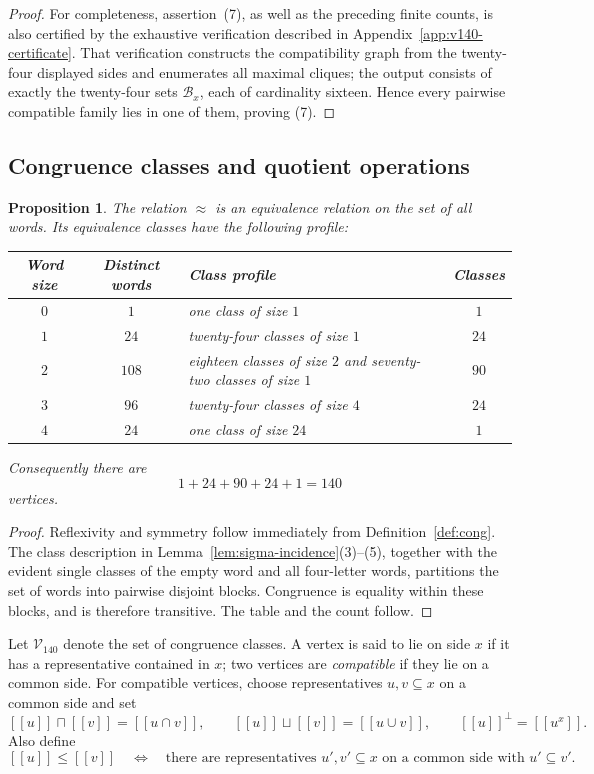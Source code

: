 \documentclass{article}   	%
\theoremstyle{plain}
\newtheorem{proposition}[theorem]{Proposition}
\theoremstyle{definition}
\theoremstyle{remark}
\begin{document}
\begin{proof}
For completeness, assertion~(7), as well as the preceding finite counts, is
also certified by the exhaustive verification described in
Appendix~\ref{app:v140-certificate}.  That verification constructs the
compatibility graph from the twenty-four displayed sides and enumerates all
maximal cliques; the output consists of exactly the twenty-four sets
$\mathcal B_x$, each of cardinality sixteen.  Hence every pairwise compatible
family lies in one of them, proving (7).
\end{proof}

\subsection{Congruence classes and quotient operations}

\begin{proposition}
\label{prop:cong-equivalence}
The relation $\approx$ is an equivalence relation on the set of all words.
Its equivalence classes have the following profile:
\begin{center}
\small
\begin{tabular}{c|c|p{5.0cm}|c}
\textbf{Word size} & \textbf{Distinct words} & \textbf{Class profile} &
\textbf{Classes}\\ \hline
$0$ & $1$ & one class of size $1$ & $1$\\
$1$ & $24$ & twenty-four classes of size $1$ & $24$\\
$2$ & $108$ & eighteen classes of size $2$ and seventy-two classes of size $1$ & $90$\\
$3$ & $96$ & twenty-four classes of size $4$ & $24$\\
$4$ & $24$ & one class of size $24$ & $1$
\end{tabular}
\end{center}
Consequently there are
\[
1+24+90+24+1=140
\]
vertices.
\end{proposition}

\begin{proof}
Reflexivity and symmetry follow immediately from Definition~\ref{def:cong}.
The class description in Lemma~\ref{lem:sigma-incidence}(3)--(5), together with
the evident single classes of the empty word and all four-letter words, partitions
the set of words into pairwise disjoint blocks.  Congruence is equality within
these blocks, and is therefore transitive.  The table and the count follow.
\end{proof}

Let $\mathcal V_{140}$ denote the set of congruence classes.  A vertex is said
to lie on side $x$ if it has a representative contained in $x$; two vertices
are \emph{compatible} if they lie on a common side.  For compatible vertices,
choose representatives $u,v\subseteq x$ on a common side and set
\begin{equation}
\label{eq:v140-operations}
[[u]]\sqcap[[v]]=[[u\cap v]],\qquad
[[u]]\sqcup[[v]]=[[u\cup v]],\qquad
[[u]]^{\perp}=[[u^x]].
\end{equation}
Also define
\[
[[u]]\le [[v]]
\quad\Longleftrightarrow\quad
\text{there are representatives }u',v'\subseteq x
\text{ on a common side with }u'\subseteq v'.
\]
\end{document}
